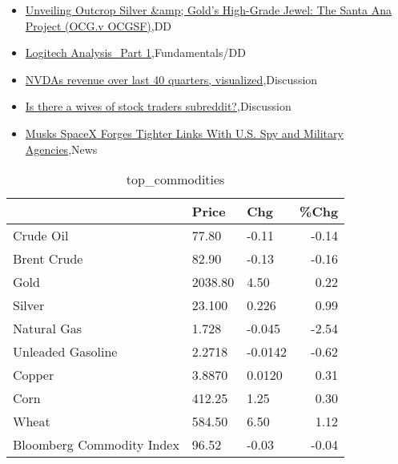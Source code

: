 \documentclass{article}%
\begin{document}
%
\begin{itemize}%
\item%
\href{https://reddit.com/r/Baystreetbets/comments/1awsrl5/unveiling\_outcrop\_silver\_golds\_highgrade\_jewel/}{Unveiling Outcrop Silver \&amp; Gold's High-Grade Jewel: The Santa Ana Project (OCG.v OCGSF)},DD%
\item%
\href{https://reddit.com/r/StockMarket/comments/1ax48vu/logitech\_analysis\_part\_1/}{Logitech Analysis\_Part 1},Fundamentals/DD%
\item%
\href{https://reddit.com/r/StockMarket/comments/1awu99q/nvdas\_revenue\_over\_last\_40\_quarters\_visualized/}{NVDAs revenue over last 40 quarters, visualized},Discussion%
\item%
\href{https://reddit.com/r/StockMarket/comments/1awtr3h/is\_there\_a\_wives\_of\_stock\_traders\_subreddit/}{Is there a wives of stock traders subreddit?},Discussion%
\item%
\href{https://reddit.com/r/Economics/comments/1awyr3t/musks\_spacex\_forges\_tighter\_links\_with\_us\_spy\_and/}{Musks SpaceX Forges Tighter Links With U.S. Spy and Military Agencies},News%
\end{itemize}%


\begin{table}[htbp]%
\caption{top\_commodities}%
\centering%
\begin{adjustbox}{width=1\textwidth}%
\begin{tabular}{lllr}
\toprule
                          &   Price &     Chg &  \%Chg \\
\midrule
               Crude Oil  &   77.80 &   -0.11 & -0.14 \\
             Brent Crude  &   82.90 &   -0.13 & -0.16 \\
                    Gold  & 2038.80 &    4.50 &  0.22 \\
                  Silver  &  23.100 &   0.226 &  0.99 \\
             Natural Gas  &   1.728 &  -0.045 & -2.54 \\
       Unleaded Gasoline  &  2.2718 & -0.0142 & -0.62 \\
                  Copper  &  3.8870 &  0.0120 &  0.31 \\
                    Corn  &  412.25 &    1.25 &  0.30 \\
                   Wheat  &  584.50 &    6.50 &  1.12 \\
Bloomberg Commodity Index &   96.52 &   -0.03 & -0.04 \\
\bottomrule
\end{tabular}
%
\end{adjustbox}%
\end{table}
\end{document}
